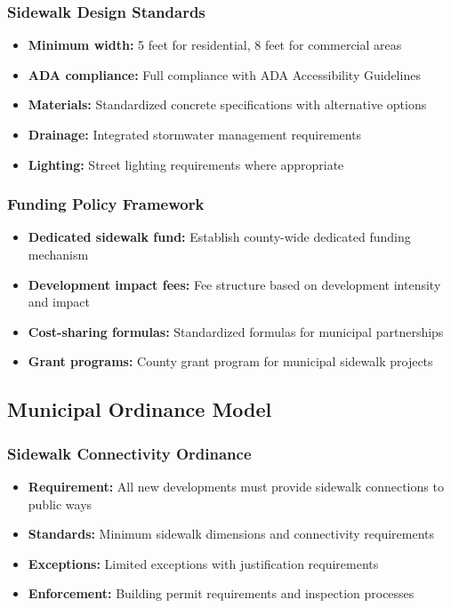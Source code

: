 \documentclass[11pt,letterpaper]{article}
\begin{document}
\subsubsection{Sidewalk Design Standards}
\begin{itemize}
    \item \textbf{Minimum width:} 5 feet for residential, 8 feet for commercial areas
    \item \textbf{ADA compliance:} Full compliance with ADA Accessibility Guidelines
    \item \textbf{Materials:} Standardized concrete specifications with alternative options
    \item \textbf{Drainage:} Integrated stormwater management requirements
    \item \textbf{Lighting:} Street lighting requirements where appropriate
\end{itemize}

\subsubsection{Funding Policy Framework}
\begin{itemize}
    \item \textbf{Dedicated sidewalk fund:} Establish county-wide dedicated funding mechanism
    \item \textbf{Development impact fees:} Fee structure based on development intensity and impact
    \item \textbf{Cost-sharing formulas:} Standardized formulas for municipal partnerships
    \item \textbf{Grant programs:} County grant program for municipal sidewalk projects
\end{itemize}

\subsection{Municipal Ordinance Model}

\subsubsection{Sidewalk Connectivity Ordinance}
\begin{itemize}
    \item \textbf{Requirement:} All new developments must provide sidewalk connections to public ways
    \item \textbf{Standards:} Minimum sidewalk dimensions and connectivity requirements
    \item \textbf{Exceptions:} Limited exceptions with justification requirements
    \item \textbf{Enforcement:} Building permit requirements and inspection processes
\end{itemize}
\end{document}
